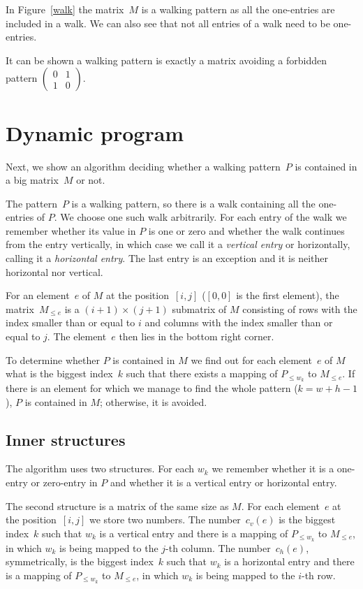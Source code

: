 In Figure~\ref{walk} the matrix~$M$ is a walking pattern as all the one-entries are included in a walk. We can also see that not all entries of a walk need to be one-entries.

It can be shown a walking pattern is exactly a matrix avoiding a forbidden pattern $\left(\begin{smallmatrix}
0 & 1 \\
1 & 0
\end{smallmatrix}\right)$.

\section{Dynamic program}
Next, we show an algorithm deciding whether a walking pattern~$P$ is contained in a big matrix~$M$ or not.

The pattern~$P$ is a walking pattern, so there is a walk containing all the one-entries of $P$. We choose one such walk arbitrarily. For each entry of the walk we remember whether its value in $P$ is one or zero and whether the walk continues from the entry vertically, in which case we call it a \emph{vertical entry} or horizontally, calling it a \emph{horizontal entry}. The last entry is an exception and it is neither horizontal nor vertical.
\begin{defn}
For an element~$e$ of $M$ at the position~$[i,j]$ ($[0,0]$ is the first element), the matrix~$M_{\leq e}$ is a $(i+1)\times(j+1)$ submatrix of $M$ consisting of rows with the index smaller than or equal to $i$ and columns with the index smaller than or equal to $j$. The element~$e$ then lies in the bottom right corner.
\end{defn}
To determine whether $P$ is contained in $M$ we find out for each element~$e$ of $M$ what is the biggest index~$k$ such that there exists a mapping of $P_{\leq w_k}$ to $M_{\leq e}$. If there is an element for which we manage to find the whole pattern ($k=w+h-1$), $P$ is contained in $M$; otherwise, it is avoided.

\subsection{Inner structures}
The algorithm uses two structures. For each $w_k$ we remember whether it is a one-entry or zero-entry in $P$ and whether it is a vertical entry or horizontal entry.

The second structure is a matrix of the same size as $M$. For each element~$e$ at the position~$[i,j]$ we store two numbers. The number~$c_v(e)$ is the biggest index~$k$ such that $w_k$ is a vertical entry and there is a mapping of $P_{\leq w_k}$ to $M_{\leq e}$, in which $w_k$ is being mapped to the $j$-th column. The number~$c_h(e)$, symmetrically, is the biggest index~$k$ such that $w_k$ is a horizontal entry and there is a mapping of $P_{\leq w_k}$ to $M_{\leq e}$, in which $w_k$ is being mapped to the $i$-th row.

